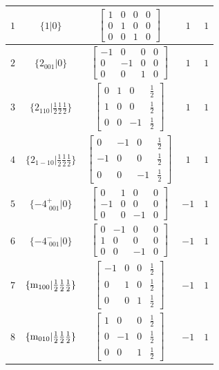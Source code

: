 \documentclass[fleqn,8pt]{jsarticle}
\begin{document}
\begin{longtable}{ccccc}
$ 1 $ & $ \{1|0\} $ & $ \begin{bmatrix} 1 & 0 & 0 & 0 \\ 0 & 1 & 0 & 0 \\ 0 & 0 & 1 & 0 \end{bmatrix} $ & $ 1 $ & $ 1 $ \\ \hline
$ 2 $ & $ \{2{}_{001}|0\} $ & $ \begin{bmatrix} -1 & 0 & 0 & 0 \\ 0 & -1 & 0 & 0 \\ 0 & 0 & 1 & 0 \end{bmatrix} $ & $ 1 $ & $ 1 $ \\ \hline
$ 3 $ & $ \{2{}_{110}|\frac{1}{2} \frac{1}{2} \frac{1}{2}\} $ & $ \begin{bmatrix} 0 & 1 & 0 & \frac{1}{2} \\ 1 & 0 & 0 & \frac{1}{2} \\ 0 & 0 & -1 & \frac{1}{2} \end{bmatrix} $ & $ 1 $ & $ 1 $ \\ \hline
$ 4 $ & $ \{2{}_{1-10}|\frac{1}{2} \frac{1}{2} \frac{1}{2}\} $ & $ \begin{bmatrix} 0 & -1 & 0 & \frac{1}{2} \\ -1 & 0 & 0 & \frac{1}{2} \\ 0 & 0 & -1 & \frac{1}{2} \end{bmatrix} $ & $ 1 $ & $ 1 $ \\ \hline
$ 5 $ & $ \{-4^{+}_{\,\,001}|0\} $ & $ \begin{bmatrix} 0 & 1 & 0 & 0 \\ -1 & 0 & 0 & 0 \\ 0 & 0 & -1 & 0 \end{bmatrix} $ & $ -1 $ & $ 1 $ \\ \hline
$ 6 $ & $ \{-4^{-}_{\,\,001}|0\} $ & $ \begin{bmatrix} 0 & -1 & 0 & 0 \\ 1 & 0 & 0 & 0 \\ 0 & 0 & -1 & 0 \end{bmatrix} $ & $ -1 $ & $ 1 $ \\ \hline
$ 7 $ & $ \{{\rm m}_{100}|\frac{1}{2} \frac{1}{2} \frac{1}{2}\} $ & $ \begin{bmatrix} -1 & 0 & 0 & \frac{1}{2} \\ 0 & 1 & 0 & \frac{1}{2} \\ 0 & 0 & 1 & \frac{1}{2} \end{bmatrix} $ & $ -1 $ & $ 1 $ \\ \hline
$ 8 $ & $ \{{\rm m}_{010}|\frac{1}{2} \frac{1}{2} \frac{1}{2}\} $ & $ \begin{bmatrix} 1 & 0 & 0 & \frac{1}{2} \\ 0 & -1 & 0 & \frac{1}{2} \\ 0 & 0 & 1 & \frac{1}{2} \end{bmatrix} $ & $ -1 $ & $ 1 $ \\ \hline

\end{longtable}
\end{document}

